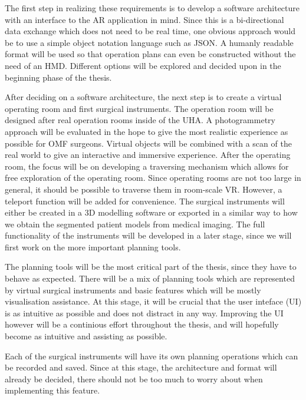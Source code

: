 The first step in realizing these requirements is to develop a software architecture with an interface to the AR application in mind.
Since this is a bi-directional data exchange which does not need to be real time, one obvious approach would be to use a simple object notation language such as JSON.
A humanly readable format will be used so that operation plans can even be constructed without the need of an HMD.
Different options will be explored and decided upon in the beginning phase of the thesis.

After deciding on a software architecture, the next step is to create a virtual operating room and first surgical instruments.
The operation room will be designed after real operation rooms inside of the UHA.
A photogrammetry approach will be evaluated in the hope to give the most realistic experience as possible for OMF surgeons.
Virtual objects will be combined with a scan of the real world to give an interactive and immersive experience.
After the operating room, the focus will be on developing a traversing mechanism which allows for free exploration of the operating room.
Since operating rooms are not too large in general, it should be possible to traverse them in room-scale VR.
However, a teleport function will be added for convenience.
The surgical instruments will either be created in a 3D modelling software or exported in a similar way to how we obtain the segmented patient models from medical imaging.
The full functionality of the instruments will be developed in a later stage, since we will first work on the more important planning tools.

The planning tools will be the most critical part of the thesis, since they have to behave as expected.
There will be a mix of planning tools which are represented by virtual surgical instruments and basic features which will be mostly visualisation assistance.
At this stage, it will be crucial that the user inteface (UI) is as intuitive as possible and does not distract in any way.
Improving the UI however will be a continious effort throughout the thesis, and will hopefully become as intuitive and assisting as possible.

Each of the surgical instruments will have its own planning operations which can be recorded and saved.
Since at this stage, the architecture and format will already be decided, there should not be too much to worry about when implementing this feature.



